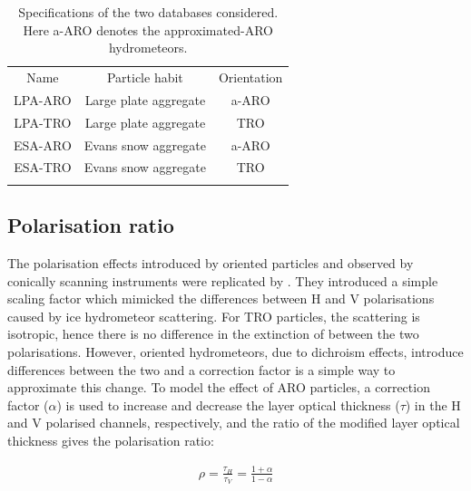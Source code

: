 \documentclass[amt, manuscript]{copernicus}
\begin{document}
 
\begin{table}[t]
	\caption{Specifications of the two databases considered. Here a-ARO denotes the approximated-ARO hydrometeors.}
	\label{tab:database_configuration}	
	\begin{tabular}{ccc}
		\tophline
		Name & Particle habit 	& Orientation  \\
		\middlehline
		LPA-ARO & Large plate aggregate & a-ARO\\
		LPA-TRO & Large plate aggregate & TRO\\
		ESA-ARO & Evans snow aggregate  & a-ARO\\
		ESA-TRO & Evans snow aggregate & TRO\\
		\bottomhline
	\end{tabular}
	\belowtable{} %
\end{table}




\subsection{Polarisation ratio}
\label{sec:polratio}

The polarisation effects introduced by oriented particles and observed by conically scanning instruments \citep{gong:micro:17} were replicated by \citet{barlakas:intro:21}. They introduced a simple scaling factor which mimicked the differences between H and V polarisations caused by ice hydrometeor scattering. For TRO particles, the scattering is isotropic, hence there is no difference in the extinction of between the two polarisations. However, oriented hydrometeors, due to dichroism effects, introduce differences between the two and a correction factor is a simple way to approximate this change. To model the effect of ARO particles, a correction factor ($\alpha$) is used to increase and decrease the layer optical thickness ($\tau$) in the H and V
polarised channels, respectively, and the ratio of the modified layer optical thickness gives the polarisation ratio:

\begin{eqnarray}
\rho = \frac{\tau_H}{\tau_V} = \frac{1+\alpha}{1-\alpha}
\end{eqnarray}
\end{document}
